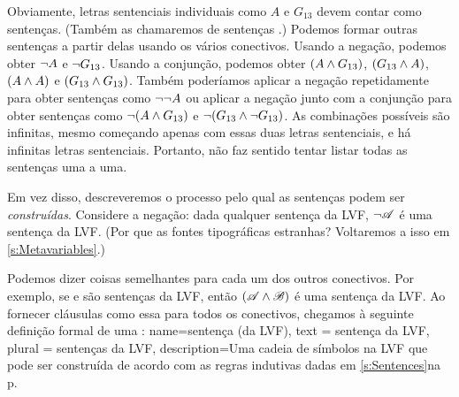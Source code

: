 Obviamente, letras sentenciais individuais como $A$ e $G_{13}$ devem
contar como sentenças. (Também as chamaremos de sentenças
.) Podemos formar outras sentenças a partir delas
usando os vários conectivos. Usando a negação, podemos obter $\neg A$ e
$\neg G_{13}$. Usando a conjunção, podemos obter $(A \wedge G_{13})$,
$(G_{13} \wedge A)$, $(A \wedge A)$ e $(G_{13} \wedge G_{13})$. Também
poderíamos aplicar a negação repetidamente para obter sentenças como
$\neg \neg A$ ou aplicar a negação junto com a conjunção para obter
sentenças como $\neg(A \wedge G_{13})$ e
$\neg(G_{13} \wedge \neg G_{13})$. As combinações possíveis são
infinitas, mesmo começando apenas com essas duas letras sentenciais, e
há infinitas letras sentenciais. Portanto, não faz sentido tentar listar
todas as sentenças uma a uma.

Em vez disso, descreveremos o processo pelo qual as sentenças podem ser
\emph{construídas}. Considere a negação: dada qualquer sentença
 da LVF, $\neg\mathscr{A}$ é uma sentença da LVF. (Por que as
fontes tipográficas estranhas? Voltaremos a isso em
\cref{s:Metavariables}.)

Podemos dizer coisas semelhantes para cada um dos outros conectivos. Por
exemplo, se  e  são sentenças da LVF, então
$(\mathscr{A}\wedge\mathscr{B})$ é uma sentença da LVF. Ao fornecer cláusulas
como essa para todos os conectivos, chegamos à seguinte definição formal
de uma :
{
name=sentença (da LVF),
text = sentença da LVF,
plural = sentenças da LVF,
description={Uma cadeia de símbolos na LVF que pode ser construída de acordo com as regras indutivas dadas \ifHTMLtarget em \cref{s:Sentences}\else na p.~\pageref{TFLsentences}\fi}
}

